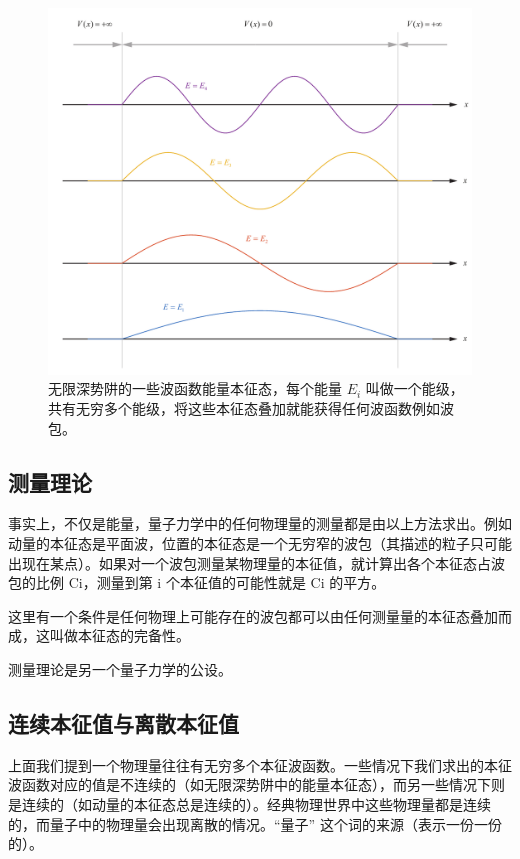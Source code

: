 \begin{figure}[ht]
\centering
\includegraphics[width=14cm]{./figures/QM04.pdf}
\caption{无限深势阱的一些波函数能量本征态，每个能量 $E_i$ 叫做一个能级，共有无穷多个能级，将这些本征态叠加就能获得任何波函数例如波包。} \label{QM0_fig4}
\end{figure}

\subsection{测量理论}

事实上，不仅是能量，量子力学中的任何物理量的测量都是由以上方法求出。例如动量的本征态是平面波，位置的本征态是一个无穷窄的波包（其描述的粒子只可能出现在某点）。如果对一个波包测量某物理量的本征值，就计算出各个本征态占波包的比例 Ci，测量到第 i 个本征值的可能性就是 Ci 的平方。

这里有一个条件是任何物理上可能存在的波包都可以由任何测量量的本征态叠加而成，这叫做本征态的完备性。

测量理论是另一个量子力学的公设。

\subsection{连续本征值与离散本征值}
上面我们提到一个物理量往往有无穷多个本征波函数。一些情况下我们求出的本征波函数对应的值是不连续的（如无限深势阱中的能量本征态），而另一些情况下则是连续的（如动量的本征态总是连续的）。经典物理世界中这些物理量都是连续的，而量子中的物理量会出现离散的情况。“量子” 这个词的来源（表示一份一份的）。

